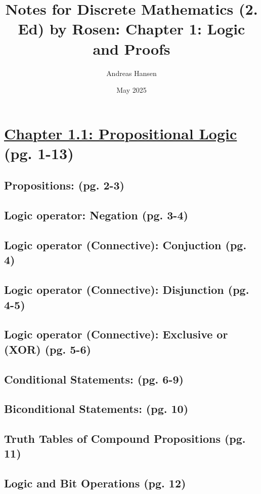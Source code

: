 \documentclass{article}
\title{Notes for Discrete Mathematics (2. Ed) by Rosen: Chapter 1: Logic and Proofs}
\author{Andreas Hansen}
\date{May 2025}
\numberwithin{equation}{section}
\numberwithin{equation}{subsection}
\begin{document}
\maketitle

\section*{\underline{Chapter 1.1: Propositional Logic} (pg. 1-13)}
\subsection*{Propositions: (pg. 2-3)}


\newpage
\subsection*{Logic operator: Negation (pg. 3-4)}


\newpage
\subsection*{Logic operator (Connective): Conjuction (pg. 4)}


\newpage
\subsection*{Logic operator (Connective): Disjunction (pg. 4-5)}


\newpage
\subsection*{Logic operator (Connective): Exclusive or (XOR) (pg. 5-6)}


\newpage
\subsection*{Conditional Statements: (pg. 6-9)}

\subsection*{Biconditional Statements: (pg. 10)}


\newpage
\subsection*{Truth Tables of Compound Propositions (pg. 11)}


\newpage
\subsection*{Logic and Bit Operations (pg. 12)}

\end{document}
